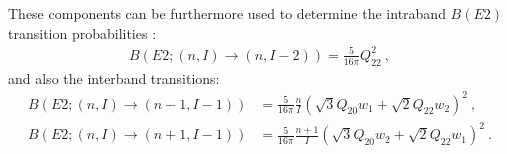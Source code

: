 These components can be furthermore used to determine the intraband $B(E2)$ transition probabilities \cite{wen2015wobbling}:
\begin{align}
    B(E2;(n,I)\to(n,I-2))=\frac{5}{16\pi}Q_{22}^2\ ,
\end{align}
and also the interband transitions:
\begin{align}
    B(E2;(n,I)\to(n-1,I-1))&=\frac{5}{16\pi}\frac{n}{I}\left(\sqrt{3}Q_{20}w_1+\sqrt{2}Q_{22}w_2\right)^2\ ,\\
    B(E2;(n,I)\to(n+1,I-1))&=\frac{5}{16\pi}\frac{n+1}{I}\left(\sqrt{3}Q_{20}w_2+\sqrt{2}Q_{22}w_1\right)^2\ .
\end{align}
